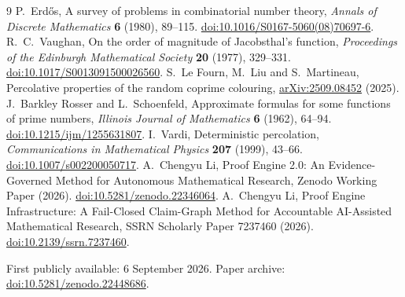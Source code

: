 \documentclass[11pt]{article}
\theoremstyle{definition}
\theoremstyle{remark}
\begin{document}
\begin{thebibliography}{9}
P.~Erd\H{o}s, A survey of problems in combinatorial number theory,
\emph{Annals of Discrete Mathematics} \textbf{6} (1980), 89--115.
\href{https://doi.org/10.1016/S0167-5060(08)70697-6}{doi:10.1016/S0167-5060(08)70697-6}.
R.~C.~Vaughan, On the order of magnitude of Jacobsthal's function,
\emph{Proceedings of the Edinburgh Mathematical Society} \textbf{20} (1977), 329--331.
\href{https://doi.org/10.1017/S0013091500026560}{doi:10.1017/S0013091500026560}.
S.~Le Fourn, M.~Liu and S.~Martineau,
Percolative properties of the random coprime colouring,
\href{https://arxiv.org/abs/2509.08452}{arXiv:2509.08452} (2025).
J.~Barkley Rosser and L.~Schoenfeld,
Approximate formulas for some functions of prime numbers,
\emph{Illinois Journal of Mathematics} \textbf{6} (1962), 64--94.
\href{https://doi.org/10.1215/ijm/1255631807}{doi:10.1215/ijm/1255631807}.
I.~Vardi, Deterministic percolation,
\emph{Communications in Mathematical Physics} \textbf{207} (1999), 43--66.
\href{https://doi.org/10.1007/s002200050717}{doi:10.1007/s002200050717}.
A.~Chengyu Li, Proof Engine 2.0: An Evidence-Governed Method for Autonomous
Mathematical Research, Zenodo Working Paper (2026).
\href{https://doi.org/10.5281/zenodo.22346064}{doi:10.5281/zenodo.22346064}.
A.~Chengyu Li, Proof Engine Infrastructure: A Fail-Closed Claim-Graph Method
for Accountable AI-Assisted Mathematical Research,
SSRN Scholarly Paper 7237460 (2026).
\href{https://doi.org/10.2139/ssrn.7237460}{doi:10.2139/ssrn.7237460}.
\end{thebibliography}
\medskip
\noindent\small First publicly available: 6 September 2026. Paper archive:
\href{https://doi.org/10.5281/zenodo.22448686}{doi:10.5281/zenodo.22448686}.
\end{document}
